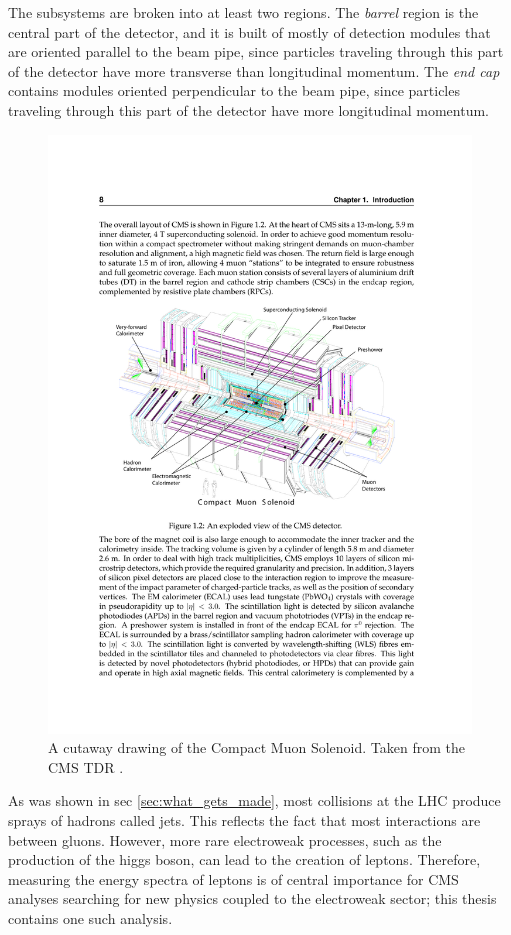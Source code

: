   The subsystems are broken into at least two regions. The \emph{barrel} region is the central part of the detector, and it is built of mostly of detection modules that are oriented parallel to the beam pipe, since particles traveling through this part of the detector have more transverse than longitudinal momentum. The \emph{end cap} contains modules oriented perpendicular to the beam pipe, since particles traveling through this part of the detector have more longitudinal momentum.

  \begin{figure}[h!]
    \centering
    \includegraphics[width=.7\textwidth]{figures/cms_detector.pdf}
    \caption{A cutaway drawing of the Compact Muon Solenoid. Taken from the CMS TDR \cite{cms_tdr}.}
    \label{fig:cms_detector}
  \end{figure}

  As was shown in sec \ref{sec:what_gets_made}, most collisions at the LHC produce sprays of hadrons called jets. This reflects the fact that most interactions are between gluons. However, more rare electroweak processes, such as the production of the higgs boson, can lead to the creation of leptons. Therefore, measuring the energy spectra of leptons is of central importance for CMS analyses searching for new physics coupled to the electroweak sector; this thesis contains one such analysis. 

